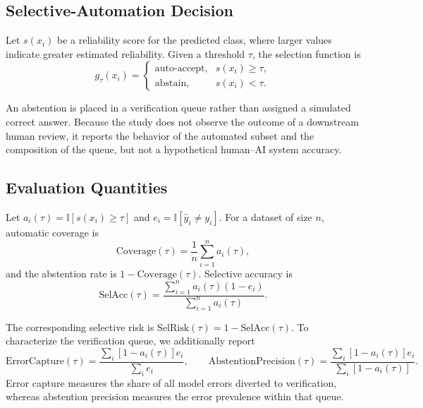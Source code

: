 \documentclass[11pt]{article}
\begin{document}
\subsection{Selective-Automation Decision}

Let $s(x_i)$ be a reliability score for the predicted class, where larger values
indicate greater estimated reliability. Given a threshold $\tau$, the selection
function is
\begin{equation}
g_{\tau}(x_i)=
\begin{cases}
  \text{auto-accept}, & s(x_i) \geq \tau,\\
  \text{abstain}, & s(x_i) < \tau.
\end{cases}
\label{eq:selection}
\end{equation}

An abstention is placed in a verification queue rather than assigned a simulated
correct answer. Because the study does not observe the outcome of a downstream
human review, it reports the behavior of the automated subset and the composition
of the queue, but not a hypothetical human--AI system accuracy.

\subsection{Evaluation Quantities}

Let $a_i(\tau)=\mathbb{I}[s(x_i)\geq\tau]$ and
$e_i=\mathbb{I}[\hat{y}_i\neq y_i]$. For a dataset of size $n$, automatic coverage
is
\begin{equation}
  \mathrm{Coverage}(\tau)
  = \frac{1}{n}\sum_{i=1}^{n}a_i(\tau),
\end{equation}
and the abstention rate is $1-\mathrm{Coverage}(\tau)$. Selective accuracy is
\begin{equation}
  \mathrm{SelAcc}(\tau)
  =
  \frac{
    \sum_{i=1}^{n}a_i(\tau)(1-e_i)
  }{
    \sum_{i=1}^{n}a_i(\tau)
  }.
\end{equation}

The corresponding selective risk is
$\mathrm{SelRisk}(\tau)=1-\mathrm{SelAcc}(\tau)$. To characterize the verification
queue, we additionally report
\begin{equation}
 \mathrm{ErrorCapture}(\tau)=
 \frac{\sum_i[1-a_i(\tau)]e_i}{\sum_i e_i},
 \qquad
 \mathrm{AbstentionPrecision}(\tau)=
 \frac{\sum_i[1-a_i(\tau)]e_i}{\sum_i[1-a_i(\tau)]}.
\end{equation}
Error capture measures the share of all model errors diverted to verification,
whereas abstention precision measures the error prevalence within that queue.
\end{document}
